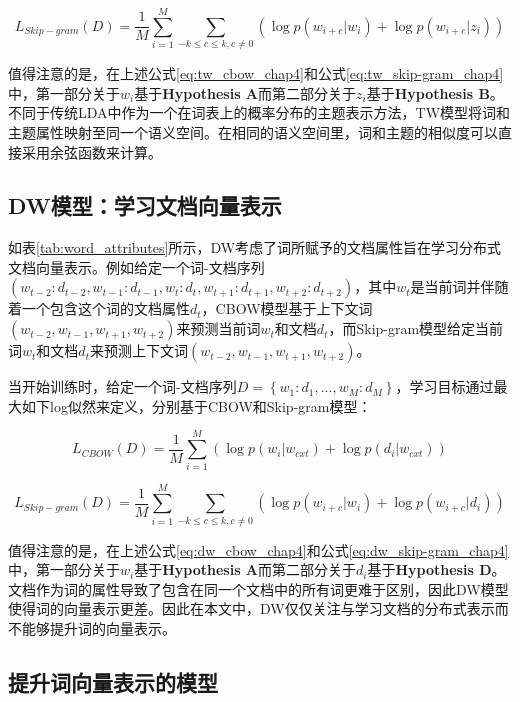 \documentclass[master]{njuthesis}
\begin{document}
	\begin{equation}\label{eq:tw_skip-gram_chap4}
	{L}_{Skip-gram}(D)=\frac{1}{M}\sum_{i=1}^{M}\sum_{-k\leq c\leq k,c\neq 0}(\log p(w_{i+c}|w_{i})+\log p(w_{i+c}|z_{i}))
	\end{equation}

值得注意的是，在上述公式\ref{eq:tw_cbow_chap4}和公式\ref{eq:tw_skip-gram_chap4}中，第一部分关于$w_i$基于\textbf{Hypothesis A}而第二部分关于$z_i$基于\textbf{Hypothesis B}。不同于传统LDA中作为一个在词表上的概率分布的主题表示方法，TW模型将词和主题属性映射至同一个语义空间。在相同的语义空间里，词和主题的相似度可以直接采用余弦函数来计算。

\subsection{DW模型：学习文档向量表示}\label{subsec_dw_chap4}

如表\ref{tab:word_attributes}所示，DW考虑了词所赋予的文档属性旨在学习分布式文档向量表示。例如给定一个词-文档序列$(w_{t-2}:d_{t-2}, w_{t-1}:d_{t-1}, w_t:d_t, w_{t+1}:d_{t+1}, w_{t+2}:d_{t+2})$，其中$w_t$是当前词并伴随着一个包含这个词的文档属性$d_t$，CBOW模型基于上下文词$(w_{t-2}, w_{t-1}, w_{t+1}, w_{t+2})$来预测当前词$w_t$和文档$d_t$，而Skip-gram模型给定当前词$w_t$和文档$d_t$来预测上下文词$(w_{t-2}, w_{t-1}, w_{t+1}, w_{t+2})$。

当开始训练时，给定一个词-文档序列$D=\left \{w_{1}:d_{1},...,w_{M}:d_{M}  \right \}$，学习目标通过最大如下log似然来定义，分别基于CBOW和Skip-gram模型：

	\begin{equation}\label{eq:dw_cbow_chap4}
	{L}_{CBOW}(D)=\frac{1}{M}\sum_{i=1}^{M}(\log p(w_{i}|w_{cxt})+\log p(d_{i}|w_{cxt}))
	\end{equation}
	
	\begin{equation}\label{eq:dw_skip-gram_chap4}
	{L}_{Skip-gram}(D)=\frac{1}{M}\sum_{i=1}^{M}\sum_{-k\leq c\leq k,c\neq 0}(\log p(w_{i+c}|w_{i})+\log p(w_{i+c}|d_{i}))
	\end{equation}

值得注意的是，在上述公式\ref{eq:dw_cbow_chap4}和公式\ref{eq:dw_skip-gram_chap4}中，第一部分关于$w_i$基于\textbf{Hypothesis A}而第二部分关于$d_i$基于\textbf{Hypothesis D}。文档作为词的属性导致了包含在同一个文档中的所有词更难于区别，因此DW模型使得词的向量表示更差。因此在本文中，DW仅仅关注与学习文档的分布式表示而不能够提升词的向量表示。

\subsection{提升词向量表示的模型}\label{subsec_improved_we_chap4}
\end{document}
